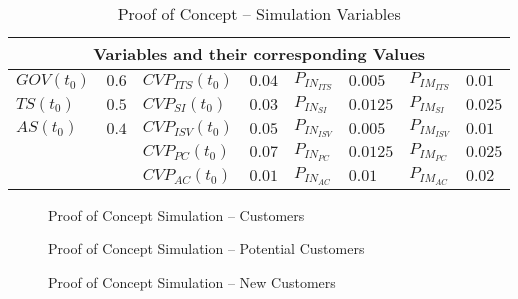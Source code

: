 

\begin{table}[t]
	\centering
	\begin{tabular}{llllllll}
		\toprule 
		\multicolumn{8}{c}{\footnotesize \textbf{Variables and their corresponding Values}} \\ \midrule
		\footnotesize $GOV(t_0)$ & \footnotesize $0.6$ & \footnotesize $CVP_{ITS}(t_0)$ & \footnotesize $0.04$ & \footnotesize $P_{IN_{ITS}}$ & \footnotesize $0.005$ & \footnotesize $P_{IM_{ITS}}$ & \footnotesize $0.01$ \\
		\footnotesize $TS(t_0)$ & \footnotesize $0.5$ & \footnotesize $CVP_{SI}(t_0)$ & \footnotesize $0.03$ & \footnotesize $P_{IN_{SI}}$ & \footnotesize $0.0125$ & \footnotesize $P_{IM_{SI}}$ & \footnotesize $0.025$ \\
		\footnotesize $AS(t_0)$ & \footnotesize $0.4$ & \footnotesize $CVP_{ISV}(t_0)$ & \footnotesize $0.05$ & \footnotesize $P_{IN_{ISV}}$ & \footnotesize $0.005$ & \footnotesize $P_{IM_{ISV}}$ & \footnotesize $0.01$ \\
		& & \footnotesize $CVP_{PC}(t_0)$ & \footnotesize $0.07$ & \footnotesize $P_{IN_{PC}}$ & \footnotesize $0.0125$ & \footnotesize $P_{IM_{PC}}$ & \footnotesize $0.025$ \\
		& & \footnotesize $CVP_{AC}(t_0)$ & \footnotesize $0.01$ & \footnotesize $P_{IN_{AC}}$ & \footnotesize $0.01$ & \footnotesize $P_{IM_{AC}}$ & \footnotesize $0.02$ \\ \bottomrule
	\end{tabular}
	\caption{Proof of Concept -- Simulation Variables}
	\label{tab:mvar:sap}
\end{table}




\begin{figure}[htb]
	\centering
	
	\caption{Proof of Concept Simulation -- Customers}
\end{figure}

\begin{figure}[htb]
	\centering
	
	\caption{Proof of Concept Simulation -- Potential Customers}
\end{figure}

\begin{figure}[htb]
	\centering
	
	\caption{Proof of Concept Simulation -- New Customers}
\end{figure}


